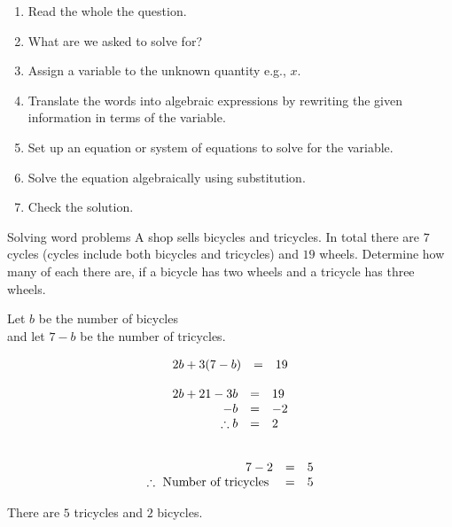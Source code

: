 \begin{enumerate}[noitemsep, label=\textbf{\arabic*}. ] 
\item Read the whole the question.
\item What are we asked to solve for?
\item Assign a variable to the unknown quantity e.g., $x$.
\item  Translate the words into algebraic expressions by rewriting the given information in terms of the variable. 
\item Set up an equation or system of equations to solve for the variable.
\item Solve the equation algebraically using substitution.
\item Check the solution.
\end{enumerate}
\begin{wex}
{Solving word problems}
{
A shop sells bicycles and tricycles. In total there are $7$ cycles (cycles include both bicycles and tricycles) and $19$ wheels. Determine how many of each there are, if a bicycle has two wheels and a tricycle has three wheels.
}
{
Let $b$ be the number of bicycles \\
and let $7-b$ be the number of tricycles. 

\begin{equation*}
\begin{array}{ccc}\hfill 2b+3(7-b)& =& 19\hfill \end{array}
\end{equation*}


\begin{equation*}
\begin{array}{ccl}
 \hfill 2b + 21 - 3b& =& 19\hfill \\
\hfill - b& =& -2\hfill \\
 \hfill \therefore b& =& 2\hfill 
\end{array}
\end{equation*}

\begin{equation*}
\begin{array}{ccl}
\\ \hfill  7 - 2 & =& 5\hfill \\
 \therefore \mbox{ Number of tricycles }& =& 5
\end{array}
\end{equation*}

 There are $5$ tricycles and $2$ bicycles.

}       
\end{wex}

